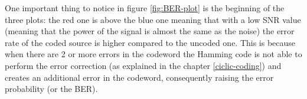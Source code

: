 One important thing to notice in figure \ref{fig:BER-plot} is the beginning of the three plots: the red one is above the blue one meaning that with a low SNR value (meaning that the power of the signal is almost the same as the noise) the error rate of the coded source is higher compared to the uncoded one. This is because when there are 2 or more errors in the codeword the Hamming code is not able to perform the error correction (as explained in the chapter \ref{ciclic-coding}) and creates an additional error in the codeword, consequently raising the error probability (or the BER).